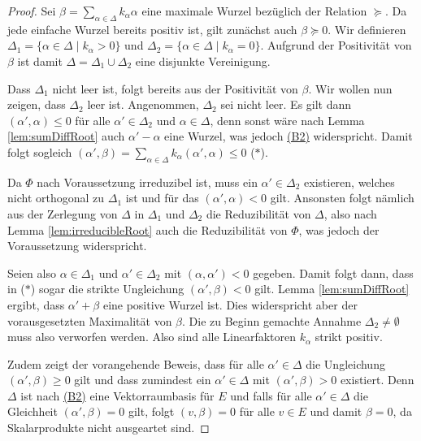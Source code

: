\begin{proof}
  Sei $\beta = \sum_{\alpha \in \Delta} k_\alpha \alpha$ eine maximale Wurzel bezüglich der Relation $\succeq$.
  Da jede einfache Wurzel bereits positiv ist, gilt zunächst auch $\beta \succeq 0$.
  Wir definieren $\Delta_1 = \{\alpha \in \Delta \mid k_\alpha > 0\}$ und $\Delta_2 = \{\alpha \in \Delta \mid k_\alpha = 0\}$.
  Aufgrund der Positivität von $\beta$ ist damit $\Delta = \Delta_1 \cup \Delta_2$ eine disjunkte Vereinigung.

  Dass $\Delta_1$ nicht leer ist, folgt bereits aus der Positivität von $\beta$.
  Wir wollen nun zeigen, dass $\Delta_2$ leer ist.
  Angenommen, $\Delta_2$ sei nicht leer.
  Es gilt dann $(\alpha', \alpha) \leq 0$ für alle $\alpha' \in \Delta_2$ und $\alpha \in \Delta$, denn sonst wäre nach Lemma \ref{lem:sumDiffRoot} auch $\alpha' - \alpha$ eine Wurzel, was jedoch \hyperref[it:B2]{(B2)} widerspricht.
  Damit folgt sogleich $(\alpha', \beta) = \sum_{\alpha \in \Delta} k_\alpha (\alpha', \alpha) \leq 0 $ ($\ast$).

  Da $\Phi$ nach Voraussetzung irreduzibel ist, muss ein $\alpha' \in \Delta_2$ existieren, welches nicht orthogonal zu $\Delta_1$ ist und für das $(\alpha', \alpha) < 0$ gilt.
  Ansonsten folgt nämlich aus der Zerlegung von $\Delta$ in $\Delta_1$ und $\Delta_2$ die Reduzibilität von $\Delta$, also nach Lemma \ref{lem:irreducibleRoot} auch die Reduzibilität von $\Phi$, was jedoch der Voraussetzung widerspricht.

  Seien also $\alpha \in \Delta_1$ und $\alpha' \in \Delta_2$ mit $(\alpha, \alpha') < 0$ gegeben.
  Damit folgt dann, dass in ($\ast$) sogar die strikte Ungleichung $(\alpha', \beta) < 0$ gilt.
  Lemma \ref{lem:sumDiffRoot} ergibt, dass $\alpha' +  \beta$ eine positive Wurzel ist.
  Dies widerspricht aber der vorausgesetzten Maximalität von $\beta$.
  Die zu Beginn gemachte Annahme $\Delta_2 \neq \emptyset$ muss also verworfen werden.
  Also sind alle Linearfaktoren $k_\alpha$ strikt positiv.

  Zudem zeigt der vorangehende Beweis, dass für alle $\alpha' \in \Delta$ die Ungleichung $(\alpha', \beta) \geq 0$ gilt und dass zumindest ein $\alpha' \in \Delta$ mit $(\alpha', \beta) > 0$ existiert.
    Denn $\Delta$ ist nach \hyperref[it:B2]{(B2)} eine Vektorraumbasis für $E$ und falls für alle $\alpha' \in \Delta$ die Gleichheit $(\alpha', \beta) = 0$ gilt, folgt $(v, \beta) = 0$ für alle $v \in E$ und damit $\beta = 0$, da Skalarprodukte nicht ausgeartet sind.


\end{proof}

